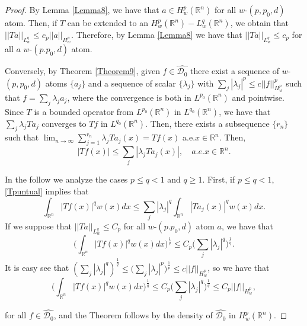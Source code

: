 \documentclass[10pt,a4paper]{amsart}
\begin{document}
	\begin{proof}
		By Lemma \ref{Lemma8}, we have that $a \in H^{p}_w(\mathbb{R}^{n})$ for all $w$-$(p,p_0,d)$ atom. Then, if $T$ can be extended to an $H^{p}_w(\mathbb{R}^{n})-L^{q}_w(\mathbb{R}^{n})$, we obtain that $||Ta||_{L^{q}_w} \leq c_p||a||_{H^{p}_w}$. Therefore, by Lemma \ref{Lemma8} we have that $||Ta||_{L^{q}_w} \leq c_p$ for all $a$ $w$-$(p.p_0,d)$ atom.
		
		Conversely, by Theorem \ref{Theorem9}, given $f \in \hat{\mathcal{D}_0}$ there exist a sequence of $w$-$(p,p_0,d)$ atoms $\{a_j\}$ and a sequence of scalar $\{\lambda_j\}$ with $\sum_j |\lambda_j|^{p} \leq c||f||^{p}_{H^{p}_w}$ such that $f=\sum_j \lambda_ja_j$, where the convergence is both in $L^{p_0}(\mathbb{R}^{n})$ and pointwise. 
		Since $T$ is a bounded operator from $L^{p_0}(\mathbb{R}^{n})$ in $L^{q_0}(\mathbb{R}^{n})$, we have that $\sum_j \lambda_jTa_j$ converges to $Tf$ in $L^{q_0}(\mathbb{R}^{n})$.
		Then, there exists a subsequence $\{r_n\}$ such that $\lim_{n \to \infty} \sum_{j=1}^{r_n} \lambda_j Ta_j(x)=Tf(x)$ a.e.$x \in \mathbb{R}^{n}$.
		Then, 
		\begin{equation}\label{Tpuntual}
			|Tf(x)| \leq \sum_j |\lambda_jTa_j(x)|, \quad a.e.x \in \mathbb{R}^{n}.
		\end{equation}
		
		In the follow we analyze the cases $p\leq q<1$ and $q\geq 1$. First, if $p\leq q<1$, \eqref{Tpuntual} implies that 
		$$ \int_{\mathbb{R}^{n}} |Tf(x)|^{q} w(x) dx \leq \sum_j |\lambda_j|^{q} \int_{\mathbb{R}^{n}} |Ta_j(x)|^{q} w(x) dx.$$
		If we suppose that $||Ta||_{L^{q}_w} \leq C_p$ for all $w$-$(p.p_0,d)$ atom $a$, we have that 
		$$ \Big(\int_{\mathbb{R}^{n}} |Tf(x)|^{q} w(x) dx \Big)^{\frac{1}{q}} \leq C_p \Big(\sum_j |\lambda_j|^{q}\Big)^{\frac{1}{q}}.$$
		It is easy see that $ \left( \sum_j |\lambda_j|^q \right)^{\frac{1}{q}} \leq \Big( \sum_j|\lambda_j|^{p}\Big)^{\frac{1}{p}} \leq c ||f||_{H^{p}_w}$, 
		so we have that 
		$$ \Big(\int_{\mathbb{R}^{n}} |Tf(x)|^{q} w(x) dx \Big)^{\frac{1}{q}} \leq C_p \Big(\sum_j |\lambda_j|^{q}\Big)^{\frac{1}{q}}  \leq C_p ||f||_{H^{p}_w},$$
		
		for all $f \in \hat{\mathcal{D}_0}$, and the Theorem follows by the density of $\hat{\mathcal{D}_0}$ in $H^{p}_w(\mathbb{R}^{n})$.
		

\end{proof}
\end{document}
